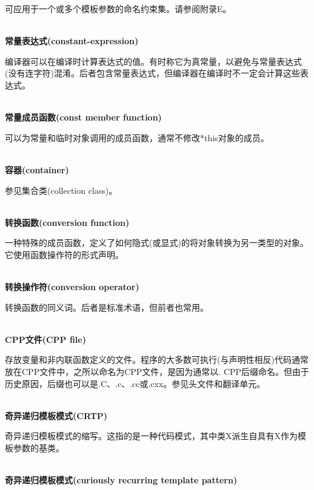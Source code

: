 可应用于一个或多个模板参数的命名约束集。请参阅附录E。

\hspace*{\fill} \\ %
\noindent
\textbf{常量表达式(constant-expression)}

编译器可以在编译时计算表达式的值。有时称它为真常量，以避免与常量表达式(没有连字符)混淆。后者包含常量表达式，但编译器在编译时不一定会计算这些表达式。

\hspace*{\fill} \\ %
\noindent
\textbf{常量成员函数(const member function)}

可以为常量和临时对象调用的成员函数，通常不修改*this对象的成员。

\hspace*{\fill} \\ %
\noindent
\textbf{容器(container)}

参见集合类(collection class)。

\hspace*{\fill} \\ %
\noindent
\textbf{转换函数(conversion function)}

一种特殊的成员函数，定义了如何隐式(或显式)的将对象转换为另一类型的对象。它使用函数操作符的形式声明。

\hspace*{\fill} \\ %
\noindent
\textbf{转换操作符(conversion operator)}

转换函数的同义词。后者是标准术语，但前者也常用。

\hspace*{\fill} \\ %
\noindent
\textbf{CPP文件(CPP file)}

存放变量和非内联函数定义的文件。程序的大多数可执行(与声明性相反)代码通常放在CPP文件中，之所以命名为CPP文件，是因为通常以. CPP后缀命名。但由于历史原因，后缀也可以是.C、.c、.cc或.cxx。参见头文件和翻译单元。

\hspace*{\fill} \\ %
\noindent
\textbf{奇异递归模板模式(CRTP)}

奇异递归模板模式的缩写。这指的是一种代码模式，其中类X派生自具有X作为模板参数的基类。

\hspace*{\fill} \\ %
\noindent
\textbf{奇异递归模板模式(curiously recurring template pattern)}

